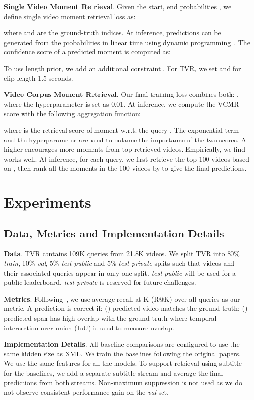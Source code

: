 \documentclass[runningheads]{llncs}
\begin{document}
\kern1mm
\noindent\textbf{Single Video Moment Retrieval}.
Given the start, end probabilities , we define single video moment retrieval loss as:

where  and  are the ground-truth indices.
At inference, predictions can be generated from the probabilities in linear time using dynamic programming~\cite{seo2016bidirectional}. The confidence score of a predicted moment  is computed as: 


\noindent
To use length prior, we add an additional constraint . For TVR, we set  and  for clip length 1.5 seconds.

\kern1mm
\noindent\textbf{Video Corpus Moment Retrieval}. 
Our final training loss combines both: , where the hyperparameter  is set as 0.01.
At inference, we compute the VCMR score with the following aggregation function:

where  is the retrieval score of moment  w.r.t. the query . 
The exponential term and the hyperparameter  are used to balance the importance of the two scores. 
A higher  encourages more moments from top retrieved videos. 
Empirically, we find  works well. 
At inference, for each query, we first retrieve the top 100 videos based on , then rank all the moments in the 100 videos by  to give the final predictions. 
 \section{Experiments}\label{experiments}


\subsection{Data, Metrics and Implementation Details}
\noindent\textbf{Data}.
TVR contains 109K queries from 21.8K videos. 
We split TVR into 80\% \textit{train}, 10\% \textit{val}, 5\% \textit{test-public} and 5\% \textit{test-private} splits such that videos and their associated queries appear in only one split. 
\textit{test-public} will be used for a public leaderboard, \textit{test-private} is reserved for future challenges. 

\kern1mm
\noindent\textbf{Metrics}.
Following~\cite{escorcia2019temporal,gao2017tall}, we use average recall at K (R@K) over all queries as our metric. 
A prediction is correct if: () predicted video matches the ground truth; () predicted span has high overlap with the ground truth where 
temporal intersection over union (IoU) is used to measure overlap. 

\kern1mm
\noindent\textbf{Implementation Details}.
All baseline comparisons are configured to use the same hidden size as XML. We train the baselines following the original papers.
We use the same features for all the models. 
To support retrieval using subtitle for the baselines, we add a separate subtitle stream and average the final predictions from both streams.
Non-maximum suppression is not used as we do not observe consistent performance gain on the \textit{val} set. 
\end{document}
